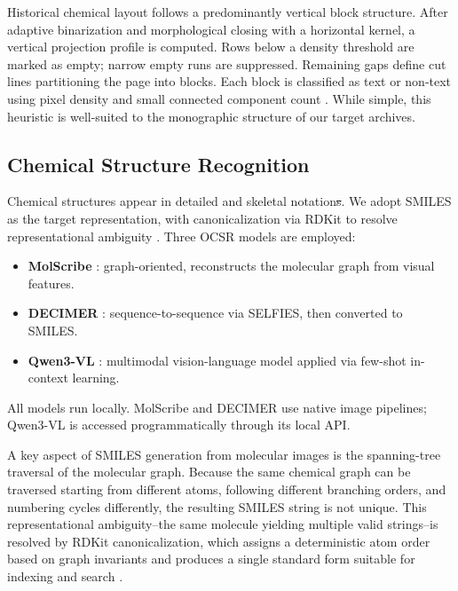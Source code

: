 \documentclass[conference]{IEEEtran}
\makeatletter
\providecommand{\DIFadd}[1]{{\protect\color{blue}\uwave{#1}}} %
\providecommand{\DIFdel}[1]{{\protect\color{red}\sout{#1}}} %
\providecommand{\DIFaddbegin}{} %
\providecommand{\DIFaddend}{} %
\providecommand{\DIFdelbegin}{} %
\providecommand{\DIFdelend}{} %
\providecommand{\DIFscaledelfig}{0.5}
\newlength{\DIFdelgraphicswidth} %
\newlength{\DIFdelgraphicsheight} %
\providecommand{\DIFaddincludegraphics}[2][]{{\color{blue}\fbox{\DIFOincludegraphics[#1]{#2}}}} %
\providecommand{\DIFdelincludegraphics}[2][]{%
\sbox{\DIFdelgraphicsbox}{\DIFOincludegraphics[#1]{#2}}%
\settoboxwidth{\DIFdelgraphicswidth}{\DIFdelgraphicsbox} %
\settoboxtotalheight{\DIFdelgraphicsheight}{\DIFdelgraphicsbox} %
\scalebox{\DIFscaledelfig}{%
\parbox[b]{\DIFdelgraphicswidth}{\usebox{\DIFdelgraphicsbox}\\[-\baselineskip] \rule{\DIFdelgraphicswidth}{0em}}\llap{\resizebox{\DIFdelgraphicswidth}{\DIFdelgraphicsheight}{%
\setlength{\unitlength}{\DIFdelgraphicswidth}%
\begin{picture}(1,1)%
\thicklines\linethickness{2pt} %
{\color[rgb]{1,0,0}\put(0,0){\framebox(1,1){}}}%
{\color[rgb]{1,0,0}\put(0,0){\line( 1,1){1}}}%
{\color[rgb]{1,0,0}\put(0,1){\line(1,-1){1}}}%
\end{picture}%
}\hspace*{3pt}}} %
} %
\DeclareRobustCommand{\DIFaddbegin}{\DIFOaddbegin \let\includegraphics\DIFaddincludegraphics} %
\DeclareRobustCommand{\DIFaddend}{\DIFOaddend \let\includegraphics\DIFOincludegraphics} %
\DeclareRobustCommand{\DIFdelbegin}{\DIFOdelbegin \let\includegraphics\DIFdelincludegraphics} %
\DeclareRobustCommand{\DIFdelend}{\DIFOaddend \let\includegraphics\DIFOincludegraphics} %
\let\sout@orig\sout %
\renewcommand{\sout}[1]{\ifmmode\text{\sout@orig{\ensuremath{#1}}}\else\sout@orig{#1}\fi} %
\makeatother
\begin{document}
Historical chemical layout follows a predominantly vertical block structure. After adaptive binarization and morphological closing with a horizontal kernel, a vertical projection profile is computed. Rows below a density threshold are marked as empty; narrow empty runs are suppressed. Remaining gaps define cut lines partitioning the page into blocks. Each block is classified as text or non-text using pixel density and small connected component count \cite{ref5}. While simple, this heuristic is well-suited to the monographic structure of our target archives.

\subsection{Chemical Structure Recognition}

Chemical structures appear in \DIFaddbegin \DIFadd{both }\DIFaddend detailed and skeletal notation\DIFdelbegin \DIFdel{s}\DIFdelend  \cite{ref17,ref18}. We adopt SMILES \cite{ref19} as the target representation, with canonicalization via RDKit to resolve representational ambiguity \cite{ref20,ref21}. Three OCSR models are employed:

\begin{itemize}
\item \textbf{MolScribe} \cite{ref8}: graph-oriented, reconstructs the molecular graph from visual features.
\item \textbf{DECIMER} \cite{ref9,ref10}: sequence-to-sequence via SELFIES, then converted to SMILES.
\item \textbf{Qwen3-VL} \cite{ref11}: multimodal vision-language model applied via few-shot in-context learning.
\end{itemize}

All models run locally. MolScribe and DECIMER use native image pipelines; Qwen3-VL is accessed programmatically through its local API.

A key aspect of SMILES generation from molecular images is the spanning-tree traversal of the molecular graph. Because the same chemical graph can be traversed starting from different atoms, following different branching orders, and numbering cycles differently, the resulting SMILES string is not unique. This representational ambiguity--the same molecule yielding multiple valid strings--is resolved by RDKit canonicalization, which assigns a deterministic atom order based on graph invariants and produces a single standard form suitable for indexing and search \cite{ref21,ref20}.
\end{document}
